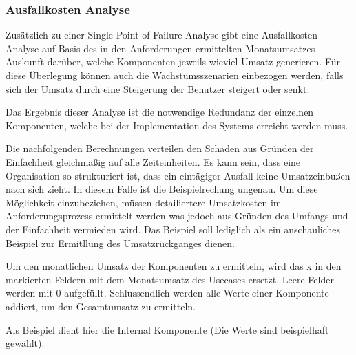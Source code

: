 \subsubsection{Ausfallkosten Analyse}
Zusätzlich zu einer Single Point of Failure Analyse gibt eine Ausfallkosten Analyse auf Basis des in den Anforderungen ermittelten Monatsumsatzes Auskunft darüber, welche Komponenten jeweils wieviel Umsatz generieren. Für diese Überlegung können auch die Wachstumsszenarien einbezogen werden, falls sich der Umsatz durch eine Steigerung der Benutzer steigert oder senkt.

Das Ergebnis dieser Analyse ist die notwendige Redundanz der einzelnen Komponenten, welche bei der Implementation des Systems erreicht werden muss.

Die nachfolgenden Berechnungen verteilen den Schaden aus Gründen der Einfachheit gleichmäßig auf alle Zeiteinheiten. Es kann sein, dass eine Organisation so strukturiert ist, dass ein eintägiger Ausfall keine Umsatzeinbußen nach sich zieht. In diesem Falle ist die Beispielrechung ungenau. Um diese Möglichkeit einzubeziehen, müssen detailiertere Umsatzkosten im Anforderungsprozess ermittelt werden was jedoch aus Gründen des Umfangs und der Einfachheit vermieden wird. Das Beispiel soll lediglich als ein anschauliches Beispiel zur Ermitllung des Umsatzrückganges dienen.

Um den monatlichen Umsatz der Komponenten zu ermitteln, wird das x in den markierten Feldern mit dem Monatsumsatz des Usecases ersetzt. Leere Felder werden mit 0 aufgefüllt. Schlussendlich werden alle Werte einer Komponente addiert, um den Gesamtumsatz zu ermitteln.

Als Beispiel dient hier die Internal Komponente (Die Werte sind beispielhaft gewählt):

\hfill \break

